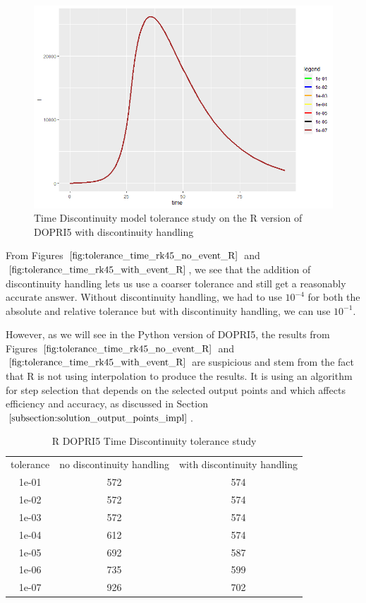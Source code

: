 \begin{figure}[H]
\centering
\includegraphics[width=0.7\linewidth]{./figures/tolerance_time_rk45_with_event_R}
\caption{Time Discontinuity model tolerance study on the R version of DOPRI5 with discontinuity handling}
\label{fig:tolerance_time_rk45_with_event_R}
\end{figure}

From Figures $\ref{fig:tolerance_time_rk45_no_event_R}$ and $\ref{fig:tolerance_time_rk45_with_event_R}$, we see that the addition of discontinuity handling lets us use a coarser tolerance and still get a reasonably accurate answer. Without discontinuity handling, we had to use $10^{-4}$ for both the absolute and relative tolerance but with discontinuity handling, we can use $10^{-1}$. 

However, as we will see in the Python version of DOPRI5, the results from Figures $\ref{fig:tolerance_time_rk45_no_event_R}$ and $\ref{fig:tolerance_time_rk45_with_event_R}$ are suspicious and stem from the fact that R is not using interpolation to produce the results. It is using an algorithm for step selection that depends on the selected output points and which affects efficiency and accuracy, as discussed in Section $\ref{subsection:solution_output_points_impl}$. 

\begin{table}[H]
\caption {R DOPRI5 Time Discontinuity tolerance study} \label{tab:tolerance_time_discontinuity_rk45_R} 
\begin{center}
\begin{tabular}{ c c c }
tolerance & no discontinuity handling & with discontinuity handling\\ 
1e-01 & 572 & 574 \\
1e-02 & 572 & 574 \\
1e-03 & 572 & 574 \\
1e-04 & 612 & 574 \\
1e-05 & 692 & 587 \\
1e-06 & 735 & 599 \\
1e-07 & 926 & 702 \\
\end{tabular}
\end{center}
\end{table}

